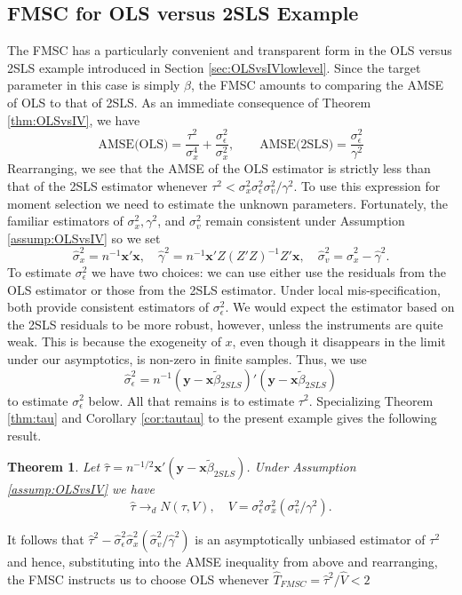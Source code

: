 \documentclass[12pt]{article}
\newtheorem{thm}{Theorem}[section]
\theoremstyle{definition}
\begin{document}
\subsection{FMSC for OLS versus 2SLS Example}
\label{sec:FMSCforOLSvsIV}
The FMSC has a particularly convenient and transparent form in the OLS versus 2SLS example introduced in Section \ref{sec:OLSvsIVlowlevel}.
Since the target parameter in this case is simply $\beta$, the FMSC amounts to comparing the AMSE of OLS to that of 2SLS. As an immediate consequence of Theorem \ref{thm:OLSvsIV}, we have
$$\mbox{AMSE(OLS)} = \frac{\tau^2}{\sigma_x^4} + \frac{\sigma_\epsilon^2}{\sigma_x^2},\quad \quad
  \mbox{AMSE(2SLS)} = \frac{\sigma_\epsilon^2}{\gamma^2}$$
 Rearranging, we see that the AMSE of the OLS estimator is strictly less than that of the 2SLS estimator whenever $\tau^2  < \sigma_x^2 \sigma_\epsilon^2\sigma_v^2/\gamma^2$. 
 To use this expression for moment selection we need to estimate the unknown parameters.
 Fortunately, the familiar estimators of $\sigma_x^2, \gamma^2$, and $\sigma_v^2$ remain consistent under Assumption \ref{assump:OLSvsIV} so we set
 $$\widehat{\sigma}_x^2 = n^{-1}\mathbf{x}'\mathbf{x}, \quad \widehat{\gamma}^2 = n^{-1}\mathbf{x}'Z(Z'Z)^{-1}Z'\mathbf{x}, \quad \widehat{\sigma}_v^2 =  \widehat{\sigma}_x^2 - \widehat{\gamma}^2.$$
To estimate $\sigma_\epsilon^2$ we have two choices: we can use either use the residuals from the OLS estimator or those from the 2SLS estimator.
Under local mis-specification, both provide consistent estimators of $\sigma_\epsilon^2$. 
We would expect the estimator based on the 2SLS residuals to be more robust, however, unless the instruments are quite weak. 
This is because the exogeneity of $x$, even though it disappears in the limit under our asymptotics, is non-zero in finite samples. 
Thus, we use 
	$$\widehat{\sigma}_\epsilon^2 = n^{-1}\left(\textbf{y} - \textbf{x}\widetilde{\beta}_{2SLS} \right)'\left(\textbf{y} - \textbf{x}\widetilde{\beta}_{2SLS} \right)$$
to estimate $\sigma_\epsilon^2$ below. 
All that remains is to estimate $\tau^2$. Specializing Theorem \ref{thm:tau} and Corollary \ref{cor:tautau} to the present example gives the following result.
\begin{thm}
	\label{thm:tauOLSvsIV}
	Let $\widehat{\tau} =  n^{-1/2} \mathbf{x}'(\mathbf{y} - \mathbf{x}\widetilde{\beta}_{2SLS})$. Under Assumption \ref{assump:OLSvsIV} we have 
	$$\widehat{\tau}\rightarrow_d N(\tau,V), \quad V = \sigma_\epsilon^2 \sigma_x^2(\sigma_v^2/\gamma^2).$$ 
\end{thm}
It follows that $\widehat{\tau}^2 -  \widehat{\sigma}_\epsilon^2\widehat{\sigma}_x^2 \left(\widehat{\sigma}_v^2/\widehat{\gamma}^2\right)$ is an asymptotically unbiased estimator of $\tau^2$ and hence, substituting into the AMSE inequality from above and rearranging, the FMSC instructs us to choose OLS whenever $\widehat{T}_{FMSC} = \widehat{\tau}^2/\widehat{V} < 2$
\end{document}
